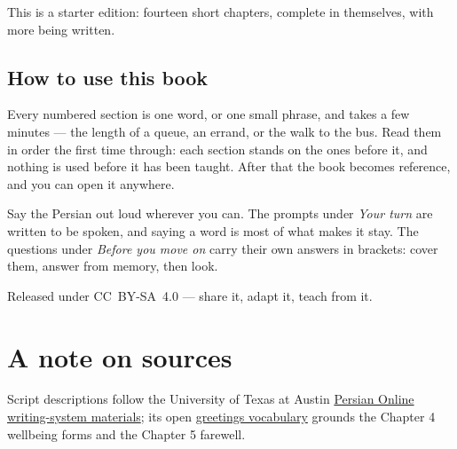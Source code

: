 \documentclass[11pt,twoside]{book}
\begin{document}
This is a starter edition: fourteen short chapters, complete in themselves,
with more being written.

\section*{How to use this book}

Every numbered section is one word, or one small phrase, and takes a few
minutes --- the length of a queue, an errand, or the walk to the bus. Read them
in order the first time through: each section stands on the ones before it, and
nothing is used before it has been taught. After that the book becomes
reference, and you can open it anywhere.

Say the Persian out loud wherever you can. The prompts under \emph{Your turn}
are written to be spoken, and saying a word is most of what makes it stay. The
questions under \emph{Before you move on} carry their own answers in brackets:
cover them, answer from memory, then look.

Released under CC~BY-SA~4.0 --- share it, adapt it, teach from it.

\tableofcontents

\mainmatter



















\backmatter





\chapter*{A note on sources}

Script descriptions follow the University of Texas at Austin
\href{https://sites.la.utexas.edu/persian_online_resources/the-writing-system/}%
{Persian Online writing-system materials}; its open
\href{https://sites.la.utexas.edu/persian_online_resources/vocabulary-lists/meetings-introductions/}%
{greetings vocabulary} grounds the Chapter 4 wellbeing forms and the Chapter 5
farewell.


\end{document}
